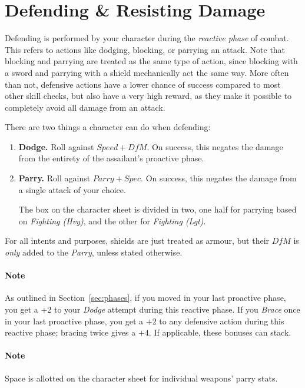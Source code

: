 \section{Defending \& Resisting Damage}\label{sec:defence}
Defending is performed by your character during the \textit{reactive phase} of combat.
This refers to actions like dodging, blocking, or parrying an attack.
Note that blocking and parrying are treated as the same type of action, since blocking with a sword and parrying with a shield mechanically act the same way.
More often than not, defensive actions have a lower chance of success compared to most other skill checks, but also have a very high reward, as they make it possible to completely avoid all damage from an attack.

There are two things a character can do when defending:
\begin{enumerate}
    \item \textbf{Dodge.} 
        Roll against $\mathit{Speed} + \mathit{DfM}$.
        On success, this negates the damage from the entirety of the assailant's proactive phase.
    \item \textbf{Parry.} 
        Roll against $Parry + Spec.$
        On success, this negates the damage from a single attack of your choice.

        The box on the character sheet is divided in two, one half for parrying based on \textit{Fighting (Hvy)}, and the other for \textit{Fighting (Lgt)}.
\end{enumerate}
For all intents and purposes, shields are just treated as armour, but their $\mathit{DfM}$ is \textit{only} added to the \textit{Parry}, unless stated otherwise.

\paragraph{Note} As outlined in Section~\ref{sec:phases}, if you moved in your last proactive phase, you get a +2 to your \textit{Dodge} attempt during this reactive phase. 
If you \textit{Brace} once in your last proactive phase, you get a $+2$ to any defensive action during this reactive phase; bracing twice gives a $+4$. 
If applicable, these bonuses can stack.

\paragraph{Note} Space is allotted on the character sheet for individual weapons' parry stats.

